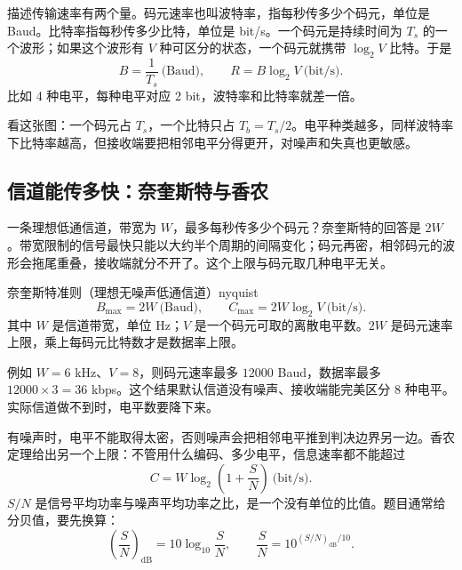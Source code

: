 描述传输速率有两个量。码元速率也叫波特率，指每秒传多少个码元，单位是 Baud。比特率指每秒传多少比特，单位是 bit/s。一个码元是持续时间为 $T_s$ 的一个波形；如果这个波形有 $V$ 种可区分的状态，一个码元就携带 $\log_2 V$ 比特。于是
\[
B=\frac{1}{T_s}\ \text{(Baud)},\qquad
R=B\log_2 V\ \text{(bit/s)}.
\]
比如 4 种电平，每种电平对应 2 bit，波特率和比特率就差一倍。

\begin{center}
\end{center}

看这张图：一个码元占 $T_s$，一个比特只占 $T_b=T_s/2$。电平种类越多，同样波特率下比特率越高，但接收端要把相邻电平分得更开，对噪声和失真也更敏感。

\subsection{信道能传多快：奈奎斯特与香农}

一条理想低通信道，带宽为 $W$，最多每秒传多少个码元？奈奎斯特的回答是 $2W$。带宽限制的信号最快只能以大约半个周期的间隔变化；码元再密，相邻码元的波形会拖尾重叠，接收端就分不开了。这个上限与码元取几种电平无关。

\begin{conclusion}{奈奎斯特准则（理想无噪声低通信道）}{nyquist}
\[
B_{\max}=2W\ \text{(Baud)},\qquad
C_{\max}=2W\log_2 V\ \text{(bit/s)}.
\]
其中 $W$ 是信道带宽，单位 Hz；$V$ 是一个码元可取的离散电平数。$2W$ 是码元速率上限，乘上每码元比特数才是数据率上限。
\end{conclusion}

例如 $W=6$ kHz、$V=8$，则码元速率最多 $12000$ Baud，数据率最多 $12000\times3=36$ kbps。这个结果默认信道没有噪声、接收端能完美区分 8 种电平。实际信道做不到时，电平数要降下来。

有噪声时，电平不能取得太密，否则噪声会把相邻电平推到判决边界另一边。香农定理给出另一个上限：不管用什么编码、多少电平，信息速率都不能超过
\[
C=W\log_2\left(1+\frac{S}{N}\right)\ \text{(bit/s)}.
\]
$S/N$ 是信号平均功率与噪声平均功率之比，是一个没有单位的比值。题目通常给分贝值，要先换算：
\[
\left(\frac{S}{N}\right)_{\mathrm{dB}}=10\log_{10}\frac{S}{N},
\qquad
\frac{S}{N}=10^{(S/N)_{\mathrm{dB}}/10}.
\]


